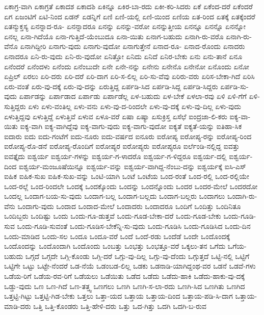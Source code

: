 {ಏಕಾಗ್ರ-ವಾಗಿ
ಏಕಾಗ್ರತೆ
ಏಕಾದಶ
ಏಕಾದಶಿ
ಏಕಿನ್ನೂ
ಏಕಿರ-ಬಾ-ರದು
ಏಕೀ-ಕರಿ-ಸಿದರು
ಏಕೆ
ಏಕೆಂದ-ದರೆ
ಏಕೆಂದರೆ
ಏಗ
ಏಜಂಟಿಗೆ
ಏಟಿ-ನಿಂದ
ಏಡನ್
ಏಡನ್ನಿಗೆ
ಏಣಿ
ಏಣಿ-ಯಲ್ಲಿ
ಏಣಿ-ಯಿಂದ
ಏಣಿಯ
ಏತ-ರಿಂದ
ಏತಕ್ಕೆ
ಏತಕ್ಕೆಂದರೆ
ಏತನ್ಮುಕ್ತಸ್ಯ
ಏನನ್ನಾದ-ರೂ-
ಏನನ್ನಾದರೂ
ಏನನ್ನು
ಏನನ್ನು-ವರೋ
ಏನನ್ನುತ್ತೀಯ
ಏನನ್ನೂ
ಏನನ್ನೊ
ಏನನ್ನೋ
ಏನಲ್ಲ
ಏನಾ-ಗಿದೆಯೊ
ಏನಾ-ಗುತ್ತಿದೆ-ಯೆಂಬುದೂ
ಏನಾ-ಯಿತು
ಏನಾಗ-ಬಹುದು
ಏನಾಗಿ-ರು-ವರೊ
ಏನಾಗಿ-ರು-ವೆನೊ
ಏನಾಗಿದ್ದೀರಿ
ಏನಾಗು-ವುದು
ಏನಾಗು-ವುದೋ
ಏನಾಗುತ್ತೇನೆ
ಏನಾದ-ರೂ-
ಏನಾದ-ರೊಂದು
ಏನಾದರು
ಏನಾದರೂ
ಏನಿ-ರು-ವುದು
ಏನಿ-ರು-ವುದೋ
ಏನಿತ್ತೋ
ಏನಿದು
ಏನಿದೆ
ಏನಿರ-ಬೇಕು
ಏನು
ಏನು-ತಾನೆ
ಏನೂ
ಏನೆಂದರೆ
ಏನೆಂದಳು
ಏನೆಂದು
ಏನೆಂಬುದೇ
ಏನೇ
ಏನೇ-ನನ್ನು
ಏನೇನು
ಏನೇನೊ
ಏನೇನೋ
ಏನೊಂದು
ಏನೋ
ಏಪ್ರಿಲ್
ಏರಲು
ಏರಿ-ದರು
ಏರಿ-ದರೆ
ಏರಿ-ದಾಗ
ಏರಿ-ಸ-ಲಿಲ್ಲ
ಏರಿ-ಸು-ವೆವು
ಏರಿರು-ವರು
ಏರಿಸ-ಬೇಕಾ-ಗಿದೆ
ಏರಿಸಿ
ಏರು-ವಂತೆ
ಏರು-ವು-ದಕ್ಕೆ
ಏರು-ವು-ದನ್ನು
ಏರುತ್ತಿದ್ದ
ಏರ್ಪಡಿ-ಸಿದ
ಏರ್ಪಡಿ-ಸಿದ್ದ
ಏರ್ಪಡಿ-ಸಿದ್ದರು
ಏರ್ಪಡಿ-ಸು-ವುದು
ಏರ್ಪಾಡನ್ನು
ಏರ್ಪಾಡಾದ
ಏರ್ಪಾಡು
ಏರ್ಪಾಡೆಲ್ಲ
ಏಳ-ಬಹುದು
ಏಳ-ಬೇಕೆ
ಏಳಲಾ-ರವು
ಏಳಿ
ಏಳಿ-ಗೆಗೆ
ಏಳಿ-ಸುತ್ತಿದ್ದರು
ಏಳು
ಏಳು-ವಂತಿಲ್ಲ
ಏಳು-ವನು
ಏಳು-ವು-ದ-ರಿಂದಲೇ
ಏಳು-ವು-ದಕ್ಕೆ
ಏಳು-ವು-ದಿಲ್ಲ
ಏಳು-ವುದು
ಏಳುತ್ತಿದ್ದವು
ಏಳುತ್ತಿದ್ದೆ
ಏಳುತ್ತಿವೆ
ಏಳುವ
ಏಳೂ-ವರೆ
ಏಷಾ
ಏಷ್ಯಾ
ಏಸುಕ್ರಿಸ್ತ
ಏಸೆಛೆ
ಐಂದ್ರಜಾ-ಲಿ-ಕರು
ಐಕ್ಯ-ವಾ-ಯಿತು
ಐಕ್ಯ-ವಾಗಿ
ಐಕ್ಯ-ವಾಗಿದ್ದೆವು
ಐಕ್ಯ-ವಾಗು-ವುದು
ಐಕ್ಯ-ವಾಗು-ವುದೋ
ಐಕ್ಯತೆ
ಐಕ್ಯತೆ-ಯನ್ನು
ಐತಿಹಾ-ಸಿಕ
ಐದಾರು
ಐದು
ಐದು-ಗಂಟೆಗೆ
ಐದು-ನೂರು
ಐದು-ವರ್ಷದ
ಐನೂರು
ಐರೋಪ್ಯ
ಐರೋಪ್ಯ-ರನ್ನು
ಐರೋಪ್ಯ-ರಿಂದ
ಐರೋಪ್ಯ-ರೊ-ಡನೆ
ಐರೋಪ್ಯ-ರೊಂದಿಗೆ
ಐರೋಪ್ಯರ
ಐರೋಪ್ಯರು
ಐರೋಪ್ಯರೂ
ಐರ್ಲೆಂಡಿ-ನಲ್ಲಿದ್ದ
ಐವತ್ತು
ಐವತ್ತೈದು
ಐಶ್ವರ್ಯ
ಐಶ್ವರ್ಯ-ಗಳನ್ನು
ಐಶ್ವರ್ಯ-ಗ-ಳಾದರೊ
ಐಶ್ವರ್ಯ-ಗ-ಳಿದ್ದರೂ
ಐಶ್ವರ್ಯ-ದಲ್ಲಿ
ಐಶ್ವರ್ಯ-ದಿಂದ
ಐಶ್ವರ್ಯ-ಮಂಜೂಷೆಯಿನ್ನೂ
ಐಶ್ವರ್ಯ-ವನ್ನು
ಐಶ್ವರ್ಯ-ವಾಗಿದ್ದ-ನೆಂಬು-ದನ್ನು
ಐಶ್ವರ್ಯಕ್ಕೆ
ಐಸಿ-ಎಸ್
ಐಹಿಕ
ಐಹಿಕ-ಸುಖ
ಐಹಿಕ-ಸುಖ-ವನ್ನು
ಒಂಟಿ-ಯಾಗಿ
ಒಂಟೆ
ಒಂಟೆಯ
ಒಂದ-ರಂತೆ
ಒಂದ-ರಲ್ಲಿ
ಒಂದ-ರಲ್ಲಿಯೇ
ಒಂದ-ರಲ್ಲೆ
ಒಂದ-ರಿಂದಲೇ
ಒಂದಕ್ಕೆ
ಒಂದಕ್ಕೊಂದು
ಒಂದನ್ನು
ಒಂದನ್ನೊಂದು
ಒಂದರ
ಒಂದರ-ಮೇಲೆ
ಒಂದರದೋ
ಒಂದಲ್ಲ
ಒಂದಾಗ-ಬಯ-ಸು-ವುದು
ಒಂದಾಗ-ಬಲ್ಲ
ಒಂದಾಗ-ಬಲ್ಲದು
ಒಂದಾಗ-ಬಲ್ಲರು
ಒಂದಾಗಲು
ಒಂದಾಗಿ-ರು-ವೆನು
ಒಂದಾಗು-ವುದು
ಒಂದಾದ
ಒಂದಾದ-ಮೇಲೆ
ಒಂದಾದರು
ಒಂದಾದರೂ
ಒಂದಿಗೆ
ಒಂದಿತ್ತು
ಒಂದಿನಿತೂ
ಒಂದಿಬ್ಬರು
ಒಂದಿಷ್ಟು
ಒಂದು
ಒಂದು-ಗೂ-ಡುತ್ತವೆ
ಒಂದು-ಗೂಡ-ಬೇಕಾ-ದರೆ
ಒಂದು-ಗೂಡ-ಬೇಕು
ಒಂದು-ಗೂಡಿ-ಸುವ
ಒಂದು-ಗೂಡಿ-ಸುವಂತೆ
ಒಂದು-ಗೂಡಿಸ-ಬೇಕೆನ್ನಿ-ಸು-ವುದು
ಒಂದು-ಗೂಡಿಸಿ
ಒಂದು-ಗೂಡಿಸಿದ
ಒಂದು-ದಿನ
ಒಂದು-ಮಾಡಿದ
ಒಂದು-ಸಲ
ಒಂದೂ
ಒಂದೂ-ವರೆ
ಒಂದೆ
ಒಂದೆ-ರಡು
ಒಂದೆಡೆ
ಒಂದೇ
ಒಂದೊಂದಕ್ಕೆ
ಒಂದೊಂದನ್ನು
ಒಂದೊಂದಾಗಿ
ಒಂದೊಂದು
ಒಂಬತ್ತು
ಒಂಭತ್ತು
ಒಂಭತ್ತೂ-ವರೆ
ಒಕ್ಕಲು-ತನ
ಒಗೆದು
ಒಗೆಯ-ಬಹುದು
ಒಗ್ಗದೆ
ಒಗ್ಗದೇ
ಒಗ್ಗಿ-ಕೊಂಡು
ಒಗ್ಗಿ-ದರೆ
ಒಗ್ಗು-ವು-ದಿಲ್ಲ
ಒಗ್ಗು-ವು-ದೆಂದು
ಒಗ್ಗುತ್ತದೆ
ಒಟ್ಟಿ-ನಲ್ಲಿ
ಒಟ್ಟಿಗೆ
ಒಟ್ಟಿಗೇ
ಒಟ್ಟು
ಒಟ್ಟೇ-ನೆಂದರೆ
ಒಡ-ನೆಯೆ
ಒಡಂಬಡ-ಲಿಲ್ಲ
ಒಡಕು
ಒಡನಾಡಿ-ಯಾಗಿದ್ದಂಥ-ವರ
ಒಡನೆ
ಒಡವೆ-ಗಳು
ಒಡೆಯ-ರಿಗೆ
ಒಡೆಯ-ರವ-ರಿಗೆ
ಒಡೆಯಲು
ಒಡೆಯಿತು
ಒಡೆದ
ಒಡೆದು
ಒಡೆದು-ಹಾಕಿ
ಒಡೆದು-ಹಾಕು-ವು-ದಕ್ಕೆ
ಒಡ್ಡು-ವುದು
ಒಣ
ಒಣ-ಗಿದೆ
ಒಣ-ತತ್ತ್ವ
ಒಣಗಲು
ಒಣಗಿ
ಒಣಗಿ-ಸ-ಲಾ-ರದು
ಒಣಗಿ-ಸಿದ
ಒಣಗಿತು
ಒಣಗಿದ
ಒತ್ತಟ್ಟಿ-ಗಿಟ್ಟು
ಒತ್ತಟ್ಟಿ-ಗಿಡ-ಬೇಕು
ಒತ್ತಲು
ಒತ್ತಾ-ಯದ
ಒತ್ತಾಯ
ಒತ್ತಾಯ-ದಿಂದ
ಒತ್ತಾಯ-ಪಡಿ-ಸಿ-ದಾಗ
ಒತ್ತಾಯ-ಮಾಡಿ-ದರು
ಒತ್ತಿ
ಒತ್ತಿ-ಕೊಂಡರು
ಒತ್ತಿ-ಹೇಳಿ-ದರು
ಒತ್ತು
ಒದ-ಗಿತ್ತು
ಒದಗಿ
ಒದಗಿ-ಬ-ರುವ
}
